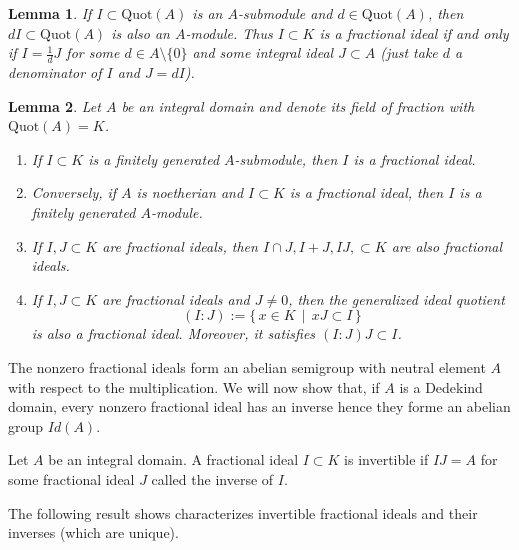 \documentclass[a4paper]{book}
\theoremstyle{break}
\theoremstyle{plain}
\newtheorem{lemma}{Lemma}[definition]
\begin{document}
\begin{lemma}
    If \(I \subset \text{Quot}(A)\) is an \(A\)-submodule and \(d \in \text{Quot}(A)\), then \(dI \subset \text{Quot}(A)\) is also an \(A\)-module. Thus \(I \subset K\) is a fractional ideal if and only if \(I = \frac{1}{d} J\) for some \(d \in A \setminus \{0\}\) and some integral ideal \(J \subset A\) (just take \(d\) a denominator of \(I\) and \(J = dI\)).
\end{lemma}

\begin{lemma}
    Let \(A\) be an integral domain and denote its field of fraction with \(\text{Quot}(A) = K\).
    \begin{enumerate}
        \item If \(I \subset K\) is a finitely generated \(A\)-submodule, then \(I\) is a fractional ideal.
        \item Conversely, if \(A\) is noetherian and \(I \subset K\) is a fractional ideal, then \(I\) is a finitely generated \(A\)-module.
        \item If \(I, J \subset K\) are fractional ideals, then \(I \cap J, I + J, IJ, \subset K\) are also fractional ideals.
        \item If \(I, J \subset K\) are fractional ideals and \(J \neq {0}\), then the generalized ideal quotient
        \begin{equation}
            (I : J) := \{\, x \in K \, \mid \, xJ \subset I \,\}
        \end{equation}
        is also a fractional ideal. Moreover, it satisfies \((I : J)J \subset I\).
    \end{enumerate}
\end{lemma}

The nonzero fractional ideals form an abelian semigroup with neutral element \(A\) with respect to the multiplication. We will now show that, if \(A\) is a Dedekind domain, every nonzero fractional ideal has an inverse hence they forme an abelian group \(Id (A)\).

\begin{definition}
    Let \(A\) be an {\color{mathif}integral domain}. A {\color{mathif}fractional ideal} \(I \subset K\) is {\color{maththen}invertible} if \(IJ = A\) for some fractional ideal \(J\) called the {\color{mathrem}inverse} of \(I\).
\end{definition}

The following result shows characterizes invertible fractional ideals and their inverses (which are unique).
\end{document}
